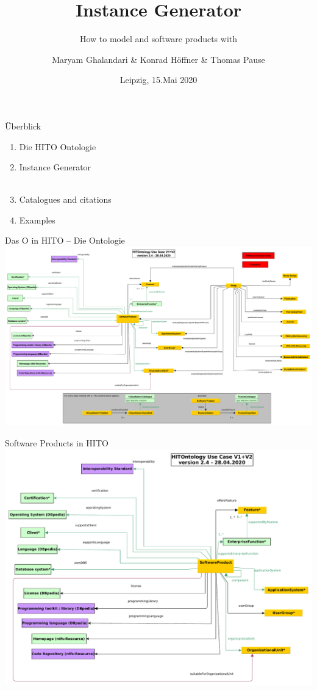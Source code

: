 \documentclass[aspectratio=1610,12pt]{beamer}
\author{Maryam Ghalandari \& Konrad Höffner \& Thomas Pause}
\date{Leipzig, 15.Mai 2020}
\title{Instance Generator}
\subtitle{How to model and software products with}
\begin{document}
\begin{frame}
\titlepage
\end{frame}

\begin{frame}{Überblick}
\begin{spacing}{1.25}
\begin{enumerate}
\item Die HITO Ontologie
\item Instance Generator
~\\ ~\\
\item Catalogues and citations
\item Examples
\end{enumerate}
\end{spacing}
\end{frame}

\begin{frame}{Das O in HITO -- Die Ontologie}
\centering
\includegraphics[width=.95\textwidth]{img/HITontology.pdf}
\end{frame}

\begin{frame}{Software Products in HITO}
\centering
\includegraphics[height=.8\textheight]{img/excerpt2.pdf}
\end{frame}
\end{document}
